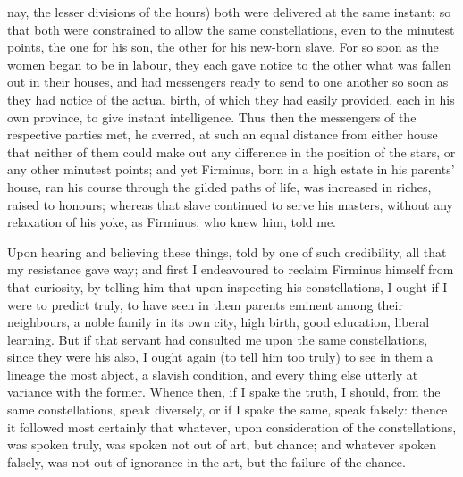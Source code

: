 \documentclass[b5paper,openright,12pt,twoside]{book}
\begin{document}
nay, the lesser divisions of the hours) both were delivered at the same
instant; so that both were constrained to allow the same constellations,
even to the minutest points, the one for his son, the other for his
new-born slave. For so soon as the women began to be in labour, they
each gave notice to the other what was fallen out in their houses, and
had messengers ready to send to one another so soon as they had notice
of the actual birth, of which they had easily provided, each in his own
province, to give instant intelligence. Thus then the messengers of
the respective parties met, he averred, at such an equal distance from
either house that neither of them could make out any difference in the
position of the stars, or any other minutest points; and yet Firminus,
born in a high estate in his parents' house, ran his course through
the gilded paths of life, was increased in riches, raised to honours;
whereas that slave continued to serve his masters, without any
relaxation of his yoke, as Firminus, who knew him, told me.

Upon hearing and believing these things, told by one of such
credibility, all that my resistance gave way; and first I endeavoured to
reclaim Firminus himself from that curiosity, by telling him that upon
inspecting his constellations, I ought if I were to predict truly, to
have seen in them parents eminent among their neighbours, a noble family
in its own city, high birth, good education, liberal learning. But if
that servant had consulted me upon the same constellations, since they
were his also, I ought again (to tell him too truly) to see in them
a lineage the most abject, a slavish condition, and every thing else
utterly at variance with the former. Whence then, if I spake the truth,
I should, from the same constellations, speak diversely, or if I
spake the same, speak falsely: thence it followed most certainly that
whatever, upon consideration of the constellations, was spoken truly,
was spoken not out of art, but chance; and whatever spoken falsely, was
not out of ignorance in the art, but the failure of the chance.
\end{document}
